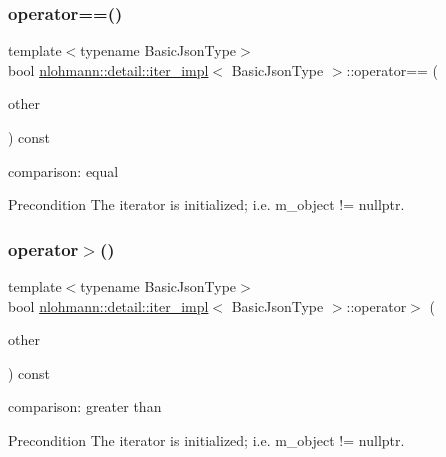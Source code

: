 \subsubsection{\texorpdfstring{operator==()}{operator==()}}
{\footnotesize\ttfamily template$<$typename Basic\+Json\+Type$>$ \\
bool \mbox{\hyperlink{classnlohmann_1_1detail_1_1iter__impl}{nlohmann\+::detail\+::iter\+\_\+impl}}$<$ Basic\+Json\+Type $>$\+::operator== (\begin{DoxyParamCaption}\item[{const \mbox{\hyperlink{classnlohmann_1_1detail_1_1iter__impl}{iter\+\_\+impl}}$<$ Basic\+Json\+Type $>$ \&}]{other }\end{DoxyParamCaption}) const\hspace{0.3cm}{\ttfamily [inline]}}



comparison\+: equal 

\begin{DoxyPrecond}{Precondition}
The iterator is initialized; i.\+e. {\ttfamily m\+\_\+object != nullptr}. 
\end{DoxyPrecond}
\mbox{\label{classnlohmann_1_1detail_1_1iter__impl_aaf3620b8dfa4bed8a9ac2b51dd55dbd7}} 
\subsubsection{\texorpdfstring{operator$>$()}{operator>()}}
{\footnotesize\ttfamily template$<$typename Basic\+Json\+Type$>$ \\
bool \mbox{\hyperlink{classnlohmann_1_1detail_1_1iter__impl}{nlohmann\+::detail\+::iter\+\_\+impl}}$<$ Basic\+Json\+Type $>$\+::operator$>$ (\begin{DoxyParamCaption}\item[{const \mbox{\hyperlink{classnlohmann_1_1detail_1_1iter__impl}{iter\+\_\+impl}}$<$ Basic\+Json\+Type $>$ \&}]{other }\end{DoxyParamCaption}) const\hspace{0.3cm}{\ttfamily [inline]}}



comparison\+: greater than 

\begin{DoxyPrecond}{Precondition}
The iterator is initialized; i.\+e. {\ttfamily m\+\_\+object != nullptr}. 
\end{DoxyPrecond}
\mbox{\label{classnlohmann_1_1detail_1_1iter__impl_a634f85da575cb60b012a687efa26e11a}} 
